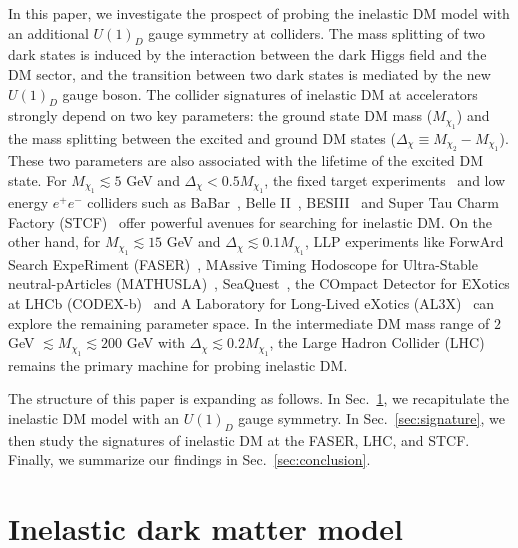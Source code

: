 \documentclass[preprint, superscriptaddress,amsmath, nofootinbib]{revtex4-1}
\begin{document}
In this paper, we investigate the prospect of probing the inelastic DM model with an additional $U(1)_D$ gauge symmetry at colliders. The mass splitting of two dark states is induced by the interaction between the dark Higgs field and the DM sector, and the transition between two dark states is mediated by the new $U(1)_D$ gauge boson. The collider signatures of inelastic DM at accelerators strongly depend on two key parameters: the ground state DM mass ($M_{\chi_1}$) and the mass splitting between the excited and ground DM states ($\Delta_{\chi}\equiv M_{\chi_2}-M_{\chi_1}$). These two parameters are also associated with the lifetime of the excited DM state. 
For $M_{\chi_1}\lesssim 5$ GeV and $\Delta_{\chi} < 0.5 M_{\chi_1}$, the fixed target experiments~\cite{A1:2011yso,PhysRevLett.107.191804,PhysRevLett.112.221802} and low energy $e^+ e^-$ colliders such as BaBar~\cite{Filippi:2019lfq}, Belle II~\cite{Belle-II:2022yaw}, BESIII~\cite{BESIII:2022oww} and Super Tau Charm Factory (STCF)~\cite{Epifanov:2020elk} offer powerful avenues for searching for inelastic DM. On the other hand, for $M_{\chi_1}\lesssim 15$ GeV and $\Delta_{\chi}\lesssim 0.1 M_{\chi_1}$, LLP experiments like ForwArd Search ExpeRiment (FASER)~\cite{FASER:2018bac,FASER:2019aik}, MAssive Timing Hodoscope for Ultra-Stable neutral-pArticles (MATHUSLA)~\cite{MATHUSLA:2022sze}, SeaQuest~\cite{Liu:2023buo}, the COmpact Detector for EXotics at LHCb (CODEX-b)~\cite{Aielli:2022awh} and A Laboratory for Long-Lived eXotics (AL3X)~\cite{Dercks:2018wum} can explore the remaining parameter space.
In the intermediate DM mass range of $2$ GeV $\lesssim M_{\chi_1} \lesssim 200$ GeV with $\Delta_{\chi} \lesssim 0.2 M_{\chi_1}$, the Large Hadron Collider (LHC) remains the primary machine for probing inelastic DM. 

The structure of this paper is expanding as follows. In Sec.~\ref{sec:model}, we recapitulate the inelastic DM model with an $U(1)_D$ gauge symmetry. In Sec.~\ref{sec:signature}, we then study the signatures of inelastic DM at the FASER, LHC, and STCF. Finally, we summarize our findings in Sec.~\ref{sec:conclusion}. 


\section{Inelastic dark matter model} 
\label{sec:model}
\end{document}

